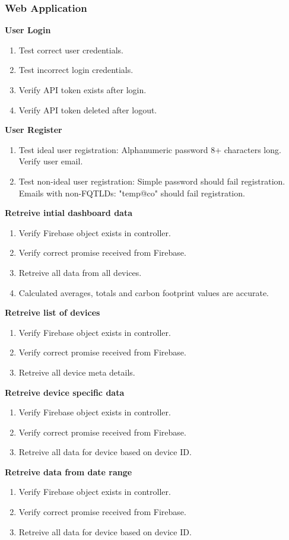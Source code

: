 \documentclass[a4paper,10pt]{article}
\begin{document}
		\subsubsection{Web Application}
		\textbf{User Login}
			\begin{enumerate}
				\item Test correct user credentials.
				\item Test incorrect login credentials.
				\item Verify API token exists after login.
				\item Verify API token deleted after logout.
			\end{enumerate}
		\textbf{User Register}
			\begin{enumerate}
				\item Test ideal user registration: Alphanumeric password 8+ characters long.
				Verify user email.
				\item Test non-ideal user registration: Simple password should fail registration.
				Emails with non-FQTLDs: "temp@co" should fail registration.
			\end{enumerate}
		\textbf{Retreive intial dashboard data}
			\begin{enumerate}
				\item Verify Firebase object exists in controller.
				\item Verify correct promise received from Firebase.
				\item Retreive all data from all devices.
				\item Calculated averages, totals and carbon footprint values are accurate.
			\end{enumerate}
		\textbf{Retreive list of devices}
			\begin{enumerate}
				\item Verify Firebase object exists in controller.
				\item Verify correct promise received from Firebase.
				\item Retreive all device meta details.
			\end{enumerate}
		\textbf{Retreive device specific data}
			\begin{enumerate}
				\item Verify Firebase object exists in controller.
				\item Verify correct promise received from Firebase.
				\item Retreive all data for device based on device ID.
			\end{enumerate}
		\textbf{Retreive data from date range}
			\begin{enumerate}
				\item Verify Firebase object exists in controller.
				\item Verify correct promise received from Firebase.
				\item Retreive all data for device based on device ID.
			\end{enumerate}
	
\end{document}
